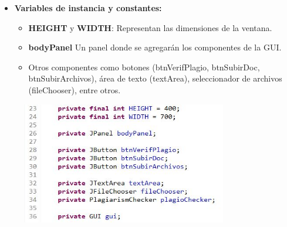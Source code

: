 \documentclass{article}
\begin{document}
	\begin{itemize}
	\item \textbf{Variables de instancia y constantes:}
	 \begin{itemize}
	 \item \textbf{HEIGHT} y  \textbf{WIDTH}: Representan las dimensiones de la ventana.
	 \item\textbf{bodyPanel} Un panel donde se agregarán los componentes de la GUI.
	 \item Otros componentes como botones (btnVerifPlagio, btnSubirDoc, btnSubirArchivos), área de texto (textArea), seleccionador de archivos (fileChooser), entre otros.
	 \end{itemize}
	\end{itemize}
	 \begin{figure}[H]
		\centering
		\includegraphics[width=0.8\textwidth,keepaspectratio]{img/GUI2.jpg}
	\end{figure}
	
\end{document}

